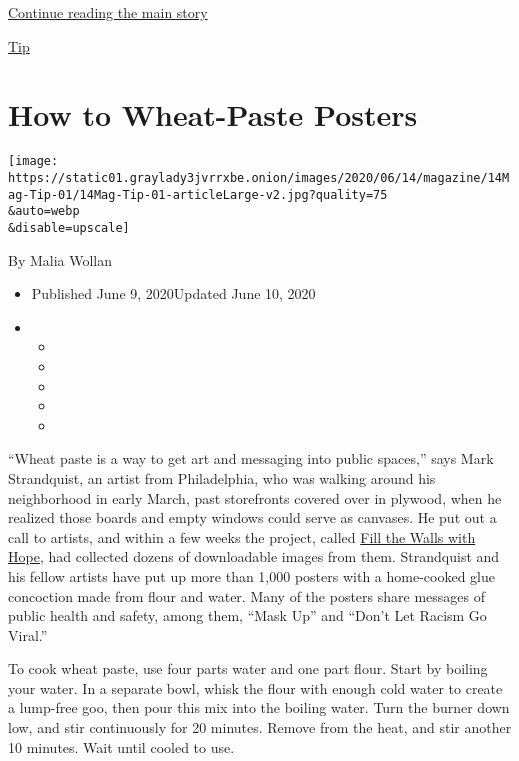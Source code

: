 \protect\hyperlink{after-sponsor}{Continue reading the main story}

\href{/column/magazine-tip}{Tip}

\hypertarget{how-to-wheat-paste-posters}{%
\section{How to Wheat-Paste Posters}\label{how-to-wheat-paste-posters}}

\texttt{[image: https://static01.graylady3jvrrxbe.onion/images/2020/06/14/magazine/14Mag-Tip-01/14Mag-Tip-01-articleLarge-v2.jpg?quality=75\\\&auto=webp\\\&disable=upscale]}

By Malia Wollan

\begin{itemize}
\item
  Published June 9, 2020Updated June 10, 2020
\item
  \begin{itemize}
  \item
  \item
  \item
  \item
  \item
  \end{itemize}
\end{itemize}

``Wheat paste is a way to get art and messaging into public spaces,''
says Mark Strandquist, an artist from Philadelphia, who was walking
around his neighborhood in early March, past storefronts covered over in
plywood, when he realized those boards and empty windows could serve as
canvases. He put out a call to artists, and within a few weeks the
project, called \href{https://coverthewallswithhope.weebly.com}{Fill the
Walls with Hope}, had collected dozens of downloadable images from them.
Strandquist and his fellow artists have put up more than 1,000 posters
with a home-cooked glue concoction made from flour and water. Many of
the posters share messages of public health and safety, among them,
``Mask Up'' and ``Don't Let Racism Go Viral.''

To cook wheat paste, use four parts water and one part flour. Start by
boiling your water. In a separate bowl, whisk the flour with enough cold
water to create a lump-free goo, then pour this mix into the boiling
water. Turn the burner down low, and stir continuously for 20 minutes.
Remove from the heat, and stir another 10 minutes. Wait until cooled to
use.

